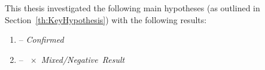 This thesis investigated the following main hypotheses (as outlined in Section~\ref{th:KeyHypothesis}) with the following results:

\begin{enumerate}
\item {} -- \emph{\mbox{\checkmark Confirmed}} 
	
	
\item {} -- \emph{\mbox{ $\times$ Mixed/Negative Result}}  %
	
	
\end{enumerate}


